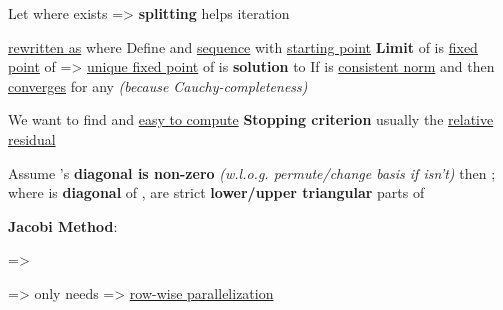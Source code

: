 Let  where 
exists => \textbf{splitting}  helps iteration
\begin{itemize}

      \vItem
             \ul{rewritten as}
             where
      \vItem
            Define  and \ul{sequence}
            with \ul{starting point} 
      \vItem
            \textbf{Limit} of  is \ul{fixed point} of  => \ul{unique fixed point} of 
            is \textbf{solution} to 
      \vItem
            If \iMbox{\lVert - \rVert} is \ul{consistent norm} and
             then  \ul{converges} for any
             \emph{(because Cauchy-completeness)}
            \begin{itemize}

                  \vItem
                        We want to find  and \ul{easy to compute} 
                  \vItem
                        \textbf{Stopping criterion} usually the \ul{relative residual}
            \end{itemize}
\end{itemize}

\hSep %

Assume 's \textbf{diagonal is non-zero} \emph{(w.l.o.g. permute/change basis if isn't)} then ;
where  is \textbf{diagonal} of ,  are strict \textbf{lower/upper triangular} parts of 

\hSep %

\textbf{Jacobi Method}:

 => 
\begin{itemize}
      \vItem
            =>  only needs
            => \ul{row-wise parallelization}
\end{itemize}

